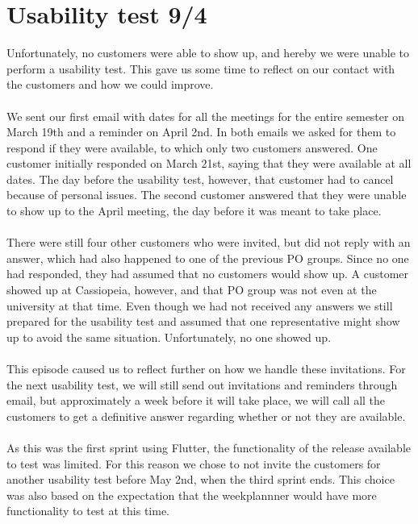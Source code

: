 \section{Usability test 9/4}\label{sprint-2-usability-test}
Unfortunately, no customers were able to show up, and hereby we were unable to perform a usability test.
This gave us some time to reflect on our contact with the customers and how we could improve.
\\\\
We sent our first email with dates for all the meetings for the entire semester on March 19th and a reminder on April 2nd.
In both emails we asked for them to respond if they were available, to which only two customers answered. 
One customer initially responded on March 21st, saying that they were available at all dates. 
The day before the usability test, however, that customer had to cancel because of personal issues.
The second customer answered that they were unable to show up to the April meeting, the day before it was meant to take place.
\\\\
There were still four other customers who were invited, but did not reply with an answer, which had also happened to one of the previous PO groups.
Since no one had responded, they had assumed that no customers would show up.
A customer showed up at Cassiopeia, however, and that PO group was not even at the university at that time. 
Even though we had not received any answers we still prepared for the usability test and assumed that one representative might show up to avoid the same situation.
Unfortunately, no one showed up.
\\\\
This episode caused us to reflect further on how we handle these invitations.
For the next usability test, we will still send out invitations and reminders through email, but approximately a week before it will take place, we will call all the customers to get a definitive answer regarding whether or not they are available. 
\\\\
As this was the first sprint using Flutter, the functionality of the release available to test was limited. 
For this reason we chose to not invite the customers for another usability test before May 2nd, when the third sprint ends.
This choice was also based on the expectation that the weekplannner would have more functionality to test at this time.
